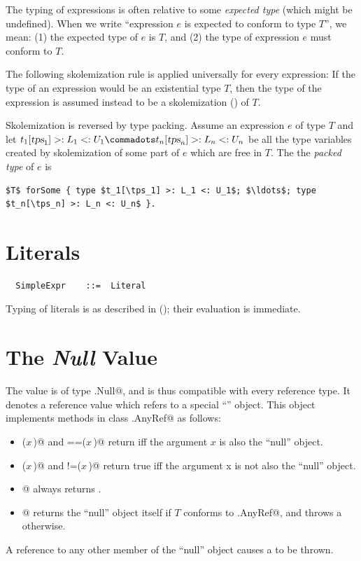 The typing of expressions is often relative to some {\em expected
type} (which might be undefined).  
When we write ``expression $e$ is expected to conform to
type $T$'', we mean: (1) the expected type of $e$ is
$T$, and (2) the type of expression $e$ must conform to
$T$.

The following skolemization rule is applied universally for every
expression: If the type of an expression would be an existential type
$T$, then the type of the expression is assumed instead to be a
skolemization () of $T$.

Skolemization is reversed by type packing. Assume an expression $e$ of
type $T$ and let $t_1[\tps_1] >: L_1 <: U_1 \commadots t_n[\tps_n] >: L_n <: U_n$ be
all the type variables created by skolemization of some part of $e$ which are free in $T$.
The the {\em packed type} of $e$ is
\begin{lstlisting}
$T$ forSome { type $t_1[\tps_1] >: L_1 <: U_1$; $\ldots$; type $t_n[\tps_n] >: L_n <: U_n$ }.
\end{lstlisting}

\section{Literals}\label{sec:literal-exprs}

\syntax\begin{lstlisting}
  SimpleExpr    ::=  Literal
\end{lstlisting}

Typing of literals is as described in (); their
evaluation is immediate.


\section{The {\em Null} Value}

The  value is of type \lstinline@scala.Null@, and is thus
compatible with every reference type.  It denotes a reference value
which refers to a special ``\lstinline@null@'' object. This object
implements methods in class \lstinline@scala.AnyRef@ as follows:
\begin{itemize}
\item
\lstinline@eq($x\,$)@ and \lstinline@==($x\,$)@ return  iff the
argument $x$ is also the ``null'' object.
\item
\lstinline@ne($x\,$)@ and \lstinline@!=($x\,$)@ return true iff the 
argument x is not also the ``null'' object.
\item
\lstinline@isInstanceOf[$T\,$]@ always returns .
\item
\lstinline@asInstanceOf[$T\,$]@ returns the ``null'' object itself if
$T$ conforms to \lstinline@scala.AnyRef@, and throws a
\lstinline@NullPointerException@ otherwise.
\end{itemize}
A reference to any other member of the ``null'' object causes a
 to be thrown. 

